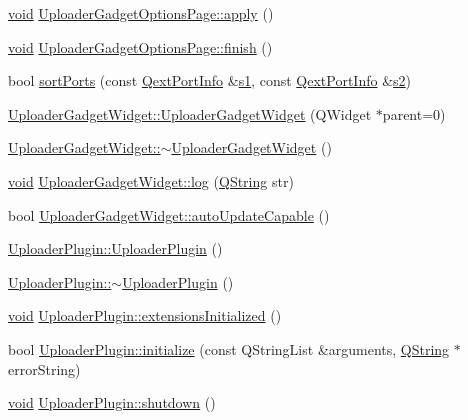\begin{DoxyCompactItemize}
\item 
\hyperlink{group___u_a_v_objects_plugin_ga444cf2ff3f0ecbe028adce838d373f5c}{void} \hyperlink{group___y_modem_uploader_gaf95a5398d31a86f095fc23d1e7fa878f}{Uploader\-Gadget\-Options\-Page\-::apply} ()
\item 
\hyperlink{group___u_a_v_objects_plugin_ga444cf2ff3f0ecbe028adce838d373f5c}{void} \hyperlink{group___y_modem_uploader_ga85b693be9a5e923d0d5bd7f1c0c50fe9}{Uploader\-Gadget\-Options\-Page\-::finish} ()
\item 
bool \hyperlink{group___y_modem_uploader_gad78f86e2b854b6285de51dbf32711129}{sort\-Ports} (const \hyperlink{struct_qext_port_info}{Qext\-Port\-Info} \&\hyperlink{_o_p_plots_8m_a2f07e0f444810cc4e54ee2be2ce0ac65}{s1}, const \hyperlink{struct_qext_port_info}{Qext\-Port\-Info} \&\hyperlink{_o_p_plots_8m_a2e63e71737e8b6802b81f6a7c5ca6a0a}{s2})
\item 
\hyperlink{group___y_modem_uploader_ga7065a066176fac2b996efaea8fc29a36}{Uploader\-Gadget\-Widget\-::\-Uploader\-Gadget\-Widget} (Q\-Widget $\ast$parent=0)
\item 
\hyperlink{group___y_modem_uploader_ga81ab4c8e328f917680b38093e9c69e6c}{Uploader\-Gadget\-Widget\-::$\sim$\-Uploader\-Gadget\-Widget} ()
\item 
\hyperlink{group___u_a_v_objects_plugin_ga444cf2ff3f0ecbe028adce838d373f5c}{void} \hyperlink{group___y_modem_uploader_ga9927716b91171f296e3a3210e372e702}{Uploader\-Gadget\-Widget\-::log} (\hyperlink{group___u_a_v_objects_plugin_gab9d252f49c333c94a72f97ce3105a32d}{Q\-String} str)
\item 
bool \hyperlink{group___y_modem_uploader_gab177e7f52b6bfc0de4547c2e37ca9c56}{Uploader\-Gadget\-Widget\-::auto\-Update\-Capable} ()
\item 
\hyperlink{group___y_modem_uploader_ga5dbbc19d5b4c070d0326c2e8695b2a9b}{Uploader\-Plugin\-::\-Uploader\-Plugin} ()
\item 
\hyperlink{group___y_modem_uploader_gab9ab9e0558901e7f3ca2e24750ded4e2}{Uploader\-Plugin\-::$\sim$\-Uploader\-Plugin} ()
\item 
\hyperlink{group___u_a_v_objects_plugin_ga444cf2ff3f0ecbe028adce838d373f5c}{void} \hyperlink{group___y_modem_uploader_ga1e319fd52ea2d055faae5cfcc9b38041}{Uploader\-Plugin\-::extensions\-Initialized} ()
\item 
bool \hyperlink{group___y_modem_uploader_gaed3cc44adfc0c7107aa35f52e5265da2}{Uploader\-Plugin\-::initialize} (const Q\-String\-List \&arguments, \hyperlink{group___u_a_v_objects_plugin_gab9d252f49c333c94a72f97ce3105a32d}{Q\-String} $\ast$error\-String)
\item 
\hyperlink{group___u_a_v_objects_plugin_ga444cf2ff3f0ecbe028adce838d373f5c}{void} \hyperlink{group___y_modem_uploader_gac966b3a48b2c1de74e802f0092479ab2}{Uploader\-Plugin\-::shutdown} ()
\end{DoxyCompactItemize}

